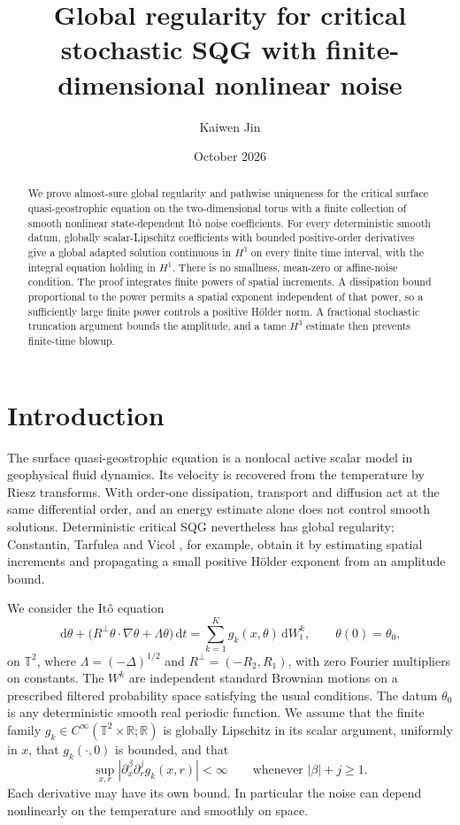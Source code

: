 \documentclass[11pt]{amsart}
\title[Critical stochastic SQG]{Global regularity for critical stochastic SQG
with finite-dimensional nonlinear noise}
\author{Kaiwen Jin}
\date{October 2026}
\theoremstyle{remark}
\numberwithin{equation}{section}
\newcommand{\T}{\mathbb T}
\newcommand{\R}{\mathbb R}
\newcommand{\dd}{\,\mathrm d}
\begin{document}
\begin{abstract}
We prove almost-sure global regularity and pathwise uniqueness for the critical
surface quasi-geostrophic equation on the two-dimensional torus with a finite
collection of smooth nonlinear state-dependent It\^o noise coefficients.
For every deterministic smooth datum, globally scalar-Lipschitz coefficients
with bounded positive-order derivatives give a global adapted solution
continuous in $H^3$ on every finite time interval, with the integral equation
holding in $H^1$. There is no smallness, mean-zero or affine-noise condition.
The proof integrates finite powers of spatial increments. A dissipation bound
proportional to the power permits a spatial exponent independent of that power,
so a sufficiently large finite power controls a positive H\"older norm.
A fractional stochastic truncation argument bounds the amplitude, and a tame
$H^3$ estimate then prevents finite-time blowup.
\end{abstract}
\maketitle

\section{Introduction}\label{sec:intro}

The surface quasi-geostrophic equation is a nonlocal active scalar model in
geophysical fluid dynamics. Its velocity is recovered from the temperature by
Riesz transforms. With order-one dissipation, transport and diffusion act at the
same differential order, and an energy estimate alone does not control smooth
solutions. Deterministic critical SQG nevertheless has global regularity;
Constantin, Tarfulea and Vicol \cite{CTV}, for example, obtain it by estimating
spatial increments and propagating a small positive H\"older exponent from an
amplitude bound.

We consider the It\^o equation
\begin{equation}\label{eq:sqg}
 \dd\theta+\big(R^\perp\theta\cdot\nabla\theta+\Lambda\theta\big)\dd t
       =\sum_{k=1}^K g_k(x,\theta)\dd W^k_t,
 \qquad \theta(0)=\theta_0,
\end{equation}
on $\T^2$, where $\Lambda=(-\Delta)^{1/2}$ and
$R^\perp=(-R_2,R_1)$, with zero Fourier multipliers on constants.
The $W^k$ are independent standard Brownian motions on a prescribed filtered
probability space satisfying the usual conditions. The datum $\theta_0$ is any
deterministic smooth real periodic function. We assume that the finite family
$g_k\in C^\infty(\T^2\times\R;\R)$ is globally Lipschitz in its scalar
argument, uniformly in $x$, that $g_k(\cdot,0)$ is bounded, and that
\begin{equation}\label{eq:coefficients}
 \sup_{x,r}|\partial_x^\beta\partial_r^j g_k(x,r)|<\infty
 \qquad\text{whenever }|\beta|+j\geq1.
\end{equation}
Each derivative may have its own bound. In particular the noise can depend
nonlinearly on the temperature and smoothly on space.
\end{document}
